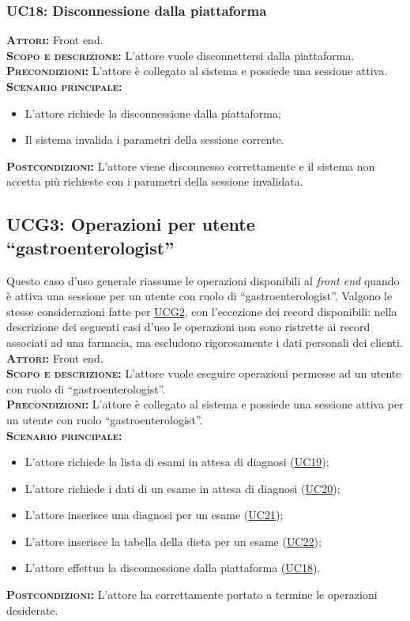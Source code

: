\subsubsection{UC18: Disconnessione dalla piattaforma}
\label{sec:UC18}
\textsc{\textbf{Attori:}} Front end.\\
\textsc{\textbf{Scopo e descrizione:}} L'attore vuole disconnettersi dalla piattaforma.\\
\textsc{\textsc{\textbf{Precondizioni:}}} L'attore è collegato al sistema e possiede una sessione attiva.\\
\textsc{\textbf{Scenario principale:}}
\begin{itemize}
    \item L'attore richiede la disconnessione dalla piattaforma;
    \item Il sistema invalida i parametri della sessione corrente.
\end{itemize}
\textsc{\textbf{Postcondizioni:}} L'attore viene disconnesso correttamente e il sistema non accetta più richieste con i parametri della sessione invalidata.

\subsection{UCG3: Operazioni per utente ``gastroenterologist''}
\label{sec:UCG3}
Questo caso d'uso generale riassume le operazioni disponibili al \textit{front end} quando è attiva una sessione per un utente con ruolo di ``gastroenterologist''. Valgono le stesse considerazioni fatte per \hyperref[sec:UCG2]{UCG2}, con l'eccezione dei record disponibili: nella descrizione dei seguenti casi d'uso le operazioni non sono ristrette ai record associati ad una farmacia, ma escludono rigorosamente i dati personali dei clienti.\\
\textsc{\textbf{Attori:}} Front end.\\
\textsc{\textbf{Scopo e descrizione:}} L'attore vuole eseguire operazioni permesse ad un utente con ruolo di ``gastroenterologist''.\\
\textsc{\textbf{Precondizioni:}} L'attore è collegato al sistema e possiede una sessione attiva per un utente con ruolo ``gastroenterologist''.\\
\textsc{\textbf{Scenario principale:}} 
\begin{itemize}
    \item L'attore richiede la lista di esami in attesa di diagnosi (\hyperref[sec:UC19]{UC19});
    \item L'attore richiede i dati di un esame in attesa di diagnosi (\hyperref[sec:UC20]{UC20});
    \item L'attore inserisce una diagnosi per un esame (\hyperref[sec:UC21]{UC21});
    \item L'attore inserisce la tabella della dieta per un esame (\hyperref[sec:UC22]{UC22});
    \item L'attore effettua la disconnessione dalla piattaforma (\hyperref[sec:UC18]{UC18}).
\end{itemize}
\textsc{\textbf{Postcondizioni:}} L'attore ha correttamente portato a termine le operazioni desiderate.

